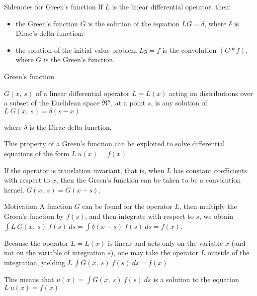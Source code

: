 \documentclass[
  ignorenonframetext,
]{beamer}
\begin{document}
\begin{frame}{Sidenotes for Green's function}
\protect\hypertarget{sidenotes-for-greens-function}{}
If \(L\) is the linear differential operator, then:

\begin{itemize}
\item
  the Green's function \(G\) is the solution of the equation
  \(LG = \delta\), where \(\delta\) is Dirac's delta function;
\item
  the solution of the initial-value problem \(Ly = f\) is the
  convolution \((G * f)\), where \(G\) is the Green's function.
\end{itemize}

\begin{alertblock} {Green's function}

$G(x,\ s)$ of a linear differential operator $L = L(x)$ acting on distributions over a subset of the Euclidean space $\mathfrak R ^n$, at a point $s$, is any solution of $L \  G(x,\ s)=\delta (s-x)$

where $\delta$ is the Dirac delta function. 

This property of a Green's function can be exploited to solve differential equations of the form  $L \ u(x)=f(x)$

\end{alertblock}
\end{frame}

\begin{frame}{}
\protect\hypertarget{section-9}{}
If the operator is translation invariant, that is, when \(L\) has
constant coefficients with respect to \(x\), then the Green's function
can be taken to be a convolution kernel, \(G(x,\ s)=G(x-s)\).

\begin{block}{Motivation}
\protect\hypertarget{motivation}{}
A function \(G\) can be found for the operator \(L\), then multiply the
Green's function by \(f(s)\), and then integrate with respect to \(s\),
we obtain
\({ \int L \  G(x,\ s)\  f(s)\  ds = \int \delta (x-s)\ f(s)\ ds=f(x)}\).

Because the operator \(L = L (x)\) is linear and acts only on the
variable \(x\) (and not on the variable of integration \(s\)), one may
take the operator \(L\) outside of the integration, yielding
\(L \ \int G(x,\ s)\ f(s)\ ds=f(x)\)

This means that \(u(x)=\int G(x,\ s)\ f(s)\ ds\) is a solution to the
equation \(L\ u(x)=f(x)\)
\end{block}
\end{frame}
\end{document}
